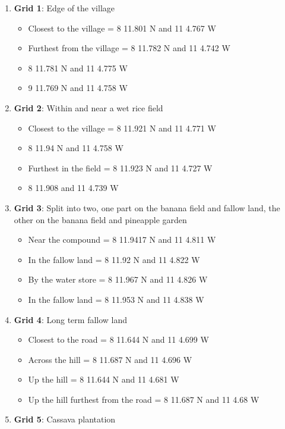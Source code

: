 \documentclass[
]{article}
\providecommand{\tightlist}{%
  \setlength{\itemsep}{0pt}\setlength{\parskip}{0pt}}
\begin{document}
\begin{enumerate}
\def\labelenumi{\arabic{enumi}.}
\tightlist
\item
  \textbf{Grid 1}: Edge of the village

  \begin{itemize}
  \tightlist
  \item
    Closest to the village = 8 11.801 N and 11 4.767 W
  \item
    Furthest from the village = 8 11.782 N and 11 4.742 W
  \item
    8 11.781 N and 11 4.775 W
  \item
    9 11.769 N and 11 4.758 W
  \end{itemize}
\item
  \textbf{Grid 2}: Within and near a wet rice field

  \begin{itemize}
  \tightlist
  \item
    Closest to the village = 8 11.921 N and 11 4.771 W
  \item
    8 11.94 N and 11 4.758 W
  \item
    Furthest in the field = 8 11.923 N and 11 4.727 W
  \item
    8 11.908 and 11 4.739 W
  \end{itemize}
\item
  \textbf{Grid 3}: Split into two, one part on the banana field and
  fallow land, the other on the banana field and pineapple garden

  \begin{itemize}
  \tightlist
  \item
    Near the compound = 8 11.9417 N and 11 4.811 W
  \item
    In the fallow land = 8 11.92 N and 11 4.822 W
  \item
    By the water store = 8 11.967 N and 11 4.826 W
  \item
    In the fallow land = 8 11.953 N and 11 4.838 W
  \end{itemize}
\item
  \textbf{Grid 4}: Long term fallow land

  \begin{itemize}
  \tightlist
  \item
    Closest to the road = 8 11.644 N and 11 4.699 W
  \item
    Across the hill = 8 11.687 N and 11 4.696 W
  \item
    Up the hill = 8 11.644 N and 11 4.681 W
  \item
    Up the hill furthest from the road = 8 11.687 N and 11 4.68 W
  \end{itemize}
\item
  \textbf{Grid 5}: Cassava plantation


\end{enumerate}
\end{document}
